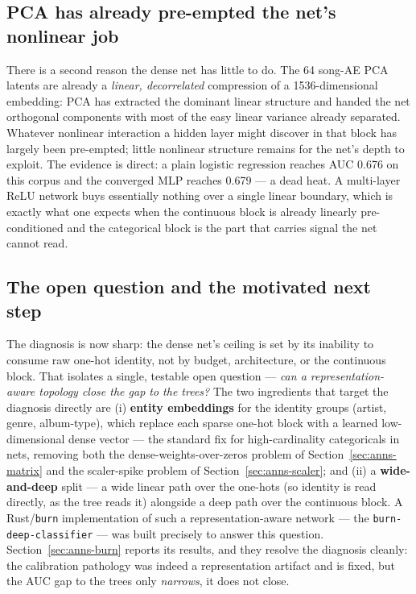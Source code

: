 \documentclass[11pt]{article}
\begin{document}
\subsection{PCA has already pre-empted the net's nonlinear job}
\label{sec:anns-pca}
There is a second reason the dense net has little to do. The 64 song-AE PCA
latents are already a \emph{linear, decorrelated} compression of a
1536-dimensional embedding: PCA has extracted the dominant linear structure and
handed the net orthogonal components with most of the easy linear variance
already separated. Whatever nonlinear interaction a hidden layer might discover
in that block has largely been pre-empted; little nonlinear structure remains for
the net's depth to exploit. The evidence is direct: a plain logistic regression
reaches AUC 0.676 on this corpus and the converged MLP reaches 0.679 --- a dead
heat. A multi-layer ReLU network buys essentially nothing over a single linear
boundary, which is exactly what one expects when the continuous block is already
linearly pre-conditioned and the categorical block is the part that carries
signal the net cannot read.

\subsection{The open question and the motivated next step}
\label{sec:anns-next}
The diagnosis is now sharp: the dense net's ceiling is set by its inability to
consume raw one-hot identity, not by budget, architecture, or the continuous
block. That isolates a single, testable open question --- \emph{can a
representation-aware topology close the gap to the trees?} The two ingredients
that target the diagnosis directly are (i) \textbf{entity embeddings} for the
identity groups (artist, genre, album-type), which replace each sparse one-hot
block with a learned low-dimensional dense vector --- the standard fix for
high-cardinality categoricals in nets, removing both the dense-weights-over-zeros
problem of Section~\ref{sec:anns-matrix} and the scaler-spike problem of
Section~\ref{sec:anns-scaler}; and (ii) a \textbf{wide-and-deep} split --- a wide
linear path over the one-hots (so identity is read directly, as the tree reads
it) alongside a deep path over the continuous block. A Rust/\texttt{burn}
implementation of such a representation-aware network --- the
\texttt{burn-deep-classifier} --- was built precisely to answer this question.
Section~\ref{sec:anns-burn} reports its results, and they resolve the diagnosis
cleanly: the calibration pathology was indeed a representation artifact and is
fixed, but the AUC gap to the trees only \emph{narrows}, it does not close.
\end{document}
